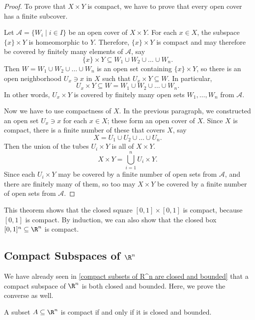\documentclass[noname]{notes}
\begin{document}
\begin{proof}
	To prove that $X \times Y$ is compact, we have to prove that every open cover has a finite subcover. 
	
	Let $\mathcal{A} = \{W_i \mid i \in I\}$ be an open cover of $X \times Y$. For each $x \in X$, the subspace $\{x\} \times Y$ is homeomorphic to $Y$. Therefore, $\{x\} \times Y$ is compact and may therefore be covered by finitely many elements of $\mathcal{A}$, say 
	\[
		\{x\} \times Y \subseteq W_1 \cup W_2 \cup \ldots \cup W_n. 
	\]
	Then $W = W_1 \cup W_2 \cup \ldots \cup W_n$ is an open set containing $\{x\} \times Y$, so there is an open neighborhood $U_x \ni x$ in $X$ such that $U_x \times Y \subseteq W$. In particular, 
	\[
		U_x \times Y \subseteq W = W_1 \cup W_2 \cup \ldots \cup W_n. 
	\]
	In other words, $U_x \times Y$ is covered by finitely many open sets $W_1, \ldots, W_n$ from $\mathcal{A}$. 
	
	Now we have to use compactness of $X$. In the previous paragraph, we constructed an open set $U_x \ni x$ for each $x \in X$; these form an open cover of $X$. Since $X$ is compact, there is a finite number of these that covers $X$, say 
	\[
		X = U_1 \cup U_2 \cup \ldots \cup U_n. 
	\]
	Then the union of the tubes $U_i \times Y$ is all of $X \times Y$. 
	\[
		X \times Y = \bigcup_{i=1}^n U_i \times Y. 
	\]
	Since each $U_i \times Y$ may be covered by a finite number of open sets from $\mathcal A$, and there are finitely many of them, so too may $X \times Y$ be covered by a finite number of open sets from $\mathcal A$. 
\end{proof}

\begin{example}
	This theorem shows that the closed square $[0,1] \times [0,1]$ is compact, because $[0,1]$ is compact. By induction, we can also show that the closed box $[0,1]^n \subseteq \R^n$ is compact. 
\end{example}

\subsection{Compact Subspaces of $\R^n$}

We have already seen in \cref{compact subsets of R^n are closed and bounded} that a compact subspace of $\R^n$ is both closed and bounded. Here, we prove the converse as well. 

\begin{theorem}
	A subset $A \subseteq \R^n$ is compact if and only if it is closed and bounded. 
\end{theorem}
\end{document}
